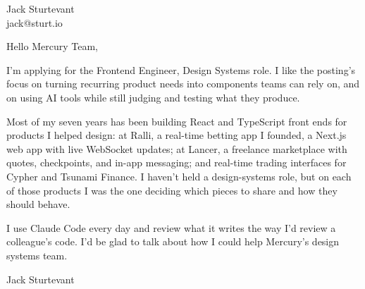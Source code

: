 \documentclass[11pt]{article}
\begin{document}
\raggedright

{\namefont\fontsize{20pt}{24pt}\selectfont Jack Sturtevant}\\[-0.3em]
jack@sturt.io

\vspace{1.2em}

Hello Mercury Team,

I'm applying for the Frontend Engineer, Design Systems role. I like the posting's focus on turning recurring product needs into components teams can rely on, and on using AI tools while still judging and testing what they produce.

Most of my seven years has been building React and TypeScript front ends for products I helped design: at Ralli, a real-time betting app I founded, a Next.js web app with live WebSocket updates; at Lancer, a freelance marketplace with quotes, checkpoints, and in-app messaging; and real-time trading interfaces for Cypher and Tsunami Finance. I haven't held a design-systems role, but on each of those products I was the one deciding which pieces to share and how they should behave.

I use Claude Code every day and review what it writes the way I'd review a colleague's code. I'd be glad to talk about how I could help Mercury's design systems team.

\vspace{0.6em}
Jack Sturtevant
\end{document}

